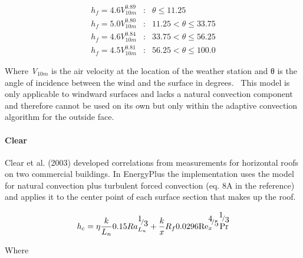 \begin{equation}
\begin{array}{lcl}
    h_f = 4.6V^{0.89}_{10m} & : & \theta \leq 11.25 \\
    h_f = 5.0V^{0.80}_{10m} & : & 11.25 < \theta \leq 33.75 \\
    h_f = 4.6V^{0.84}_{10m} & : & 33.75 < \theta \leq 56.25 \\
    h_f = 4.5V^{0.81}_{10m} & : & 56.25 < \theta \leq 100.0
\end{array}
\end{equation}

Where \emph{V\(_{10m}\)} is the air velocity at the location of the weather station and θ is the angle of incidence between the wind and the surface in degrees.~ This model is only applicable to windward surfaces and lacks a natural convection component and therefore cannot be used on its own but only within the adaptive convection algorithm for the outside face.

\paragraph{Clear}\label{clear}

Clear et al. (2003) developed correlations from measurements for horizontal roofs on two commercial buildings. In EnergyPlus the implementation uses the model for natural convection plus turbulent forced convection (eq. 8A in the reference) and applies it to the center point of each surface section that makes up the roof.

\begin{equation}
{h_c} = \eta \frac{k}{{{L_n}}}0.15Ra_{{L_n}}^{{\raise0.7ex\hbox{1} \!\mathord{\left/ {\vphantom {1 3}}\right.}\!\lower0.7ex\hbox{3}}} + \frac{k}{x}{R_f}0.0296{\mathop{\rm Re}\nolimits}_x^{{\raise0.7ex\hbox{4} \!\mathord{\left/ {\vphantom {4 5}}\right.}\!\lower0.7ex\hbox{5}}}{\Pr ^{{\raise0.7ex\hbox{1} \!\mathord{\left/ {\vphantom {1 3}}\right.}\!\lower0.7ex\hbox{3}}}}
\end{equation}

Where


